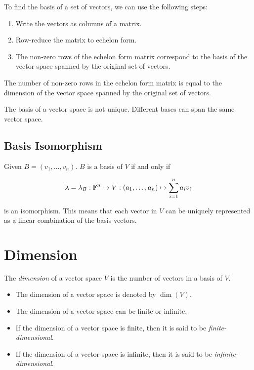 To find the basis of a set of vectors, we can use the following steps:

\begin{enumerate}

	\item Write the vectors as columns of a matrix.

	\item Row-reduce the matrix to echelon form.

	\item The non-zero rows of the echelon form matrix correspond to the basis of the vector space
	      spanned by the original set of vectors.

\end{enumerate}

The number of non-zero rows in the echelon form matrix is equal to the dimension of the vector space
spanned by the original set of vectors.

The basis of a vector space is not unique. Different bases can span the same vector space.

\subsection{Basis Isomorphism}

Given \(B = (v_1, \dots, v_n)\). \(B\) is a basis of \(V\) if and only if

\[
	\lambda = \lambda_B: \mathbb{F}^n \to V: (a_1, \dots, a_n) \mapsto \sum_{i=1}^n a_i v_i
\]

is an isomorphism. This means that each vector in \(V\) can be uniquely represented as a linear combination of the basis vectors.

\section{Dimension}

The \emph{dimension} of a vector space \(V\) is the number of vectors in a basis of \(V\).

\begin{itemize}

	\item The dimension of a vector space is denoted by \(\dim(V)\).

	\item The dimension of a vector space can be finite or infinite.

	\item If the dimension of a vector space is finite, then it is said to be \emph{finite-dimensional}.

	\item If the dimension of a vector space is infinite, then it is said to be \emph{infinite-dimensional}.

\end{itemize}

